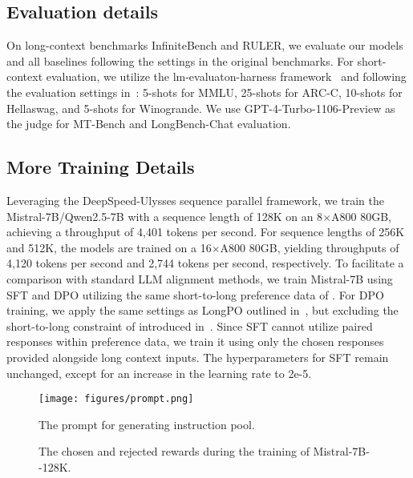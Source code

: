 \subsection{Evaluation details}
\label{subsec:eval_details}
On long-context benchmarks InfiniteBench and RULER, we evaluate our models and all baselines following the settings in the original benchmarks. For short-context evaluation, we utilize the lm-evaluaton-harness framework~\citep{eval-harness} and following the evaluation settings in~\citep{open-llm-leaderboard-v1}: 5-shots for MMLU, 25-shots for ARC-C, 10-shots for Hellaswag, and 5-shots for Winogrande. We use GPT-4-Turbo-1106-Preview as the judge for MT-Bench and LongBench-Chat evaluation.

\subsection{More Training Details}
\label{subsec:train_details}
Leveraging the DeepSpeed-Ulysses sequence parallel framework, we train the Mistral-7B/Qwen2.5-7B with a sequence length of 128K on an 8$\times$A800 80GB, achieving a throughput of 4,401 tokens per second. For sequence lengths of 256K and 512K, the models are trained on a 16$\times$A800 80GB, yielding throughputs of 4,120 tokens per second and 2,744 tokens per second, respectively.
To facilitate a comparison with standard LLM alignment methods, we train Mistral-7B using SFT and DPO utilizing the same short-to-long preference data of \ourMethod{}. For DPO training, we apply the same settings as LongPO outlined in~, but excluding the short-to-long constraint of \ourMethod{} introduced in~. Since SFT cannot utilize paired responses within preference data, we train it using only the chosen responses provided alongside long context inputs. The hyperparameters for SFT remain unchanged, except for an increase in the learning rate to 2e-5.





\begin{figure}[!t]
    \centering
    \texttt{[image: figures/prompt.png]}
    \caption{The prompt for generating instruction pool.}
    \label{fig:prompt}
\end{figure}


\begin{figure}[!t]
    \centering
    \hfill
    \caption{The chosen and rejected rewards during the training of Mistral-7B-\ourMethod-128K.}
    \label{fig:rewards}
\end{figure}




